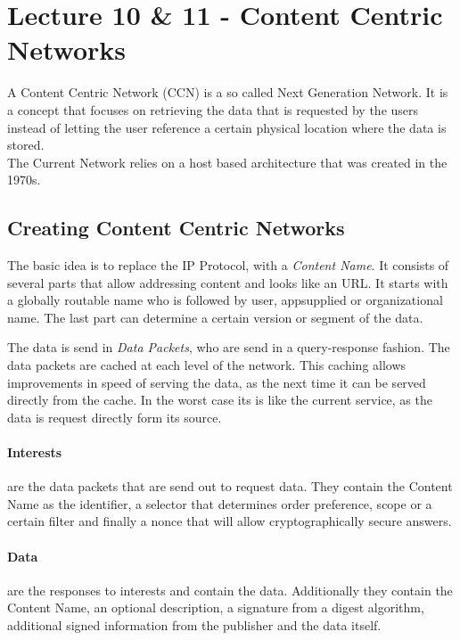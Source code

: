 \section{Lecture 10 \& 11 - Content Centric Networks} %
\label{sec:lecture_10_content_centric_networks}
A Content Centric Network (CCN) is a so called Next Generation Network.
It is a concept that focuses on retrieving the data that is requested by the users
instead of letting the user reference a certain physical location where the data is stored.\\
The Current Network relies on a host based architecture that was created in the 1970s.

\subsection{Creating Content Centric Networks} %
\label{sub:creating_content_centric_networks}
The basic idea is to replace the IP Protocol,
with a \emph{Content Name}.
It consists of several parts that allow addressing content
and looks like an URL.
It starts with a globally routable name
who is followed by user, appsupplied or organizational name.
The last part can determine a certain version or segment of the data.

The data is send in \emph{Data Packets},
who are send in a query-response fashion.
The data packets are cached at each level of the network.
This caching allows improvements in speed of serving the data,
as the next time it can be served directly from the cache.
In the worst case its is like the current service,
as the data is request directly form its source.

\paragraph{Interests} %
\label{par:interests}
are the data packets that are send out to request data.
They contain the Content Name as the identifier,
a selector that determines order preference, scope or a certain filter
and finally a nonce that will allow cryptographically secure answers.
\paragraph{Data} %
\label{par:data}
are the responses to interests and contain the data.
Additionally they contain the Content Name,
an optional description,
a signature from a digest algorithm,
additional signed information from the publisher
and the data itself.


